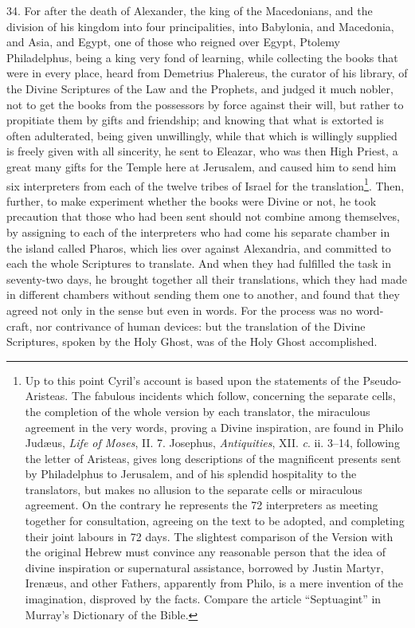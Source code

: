34. For after the death of Alexander, the king of the Macedonians, and the division of his kingdom into four principalities, into Babylonia, and Macedonia, and Asia, and Egypt, one of those who reigned over Egypt, Ptolemy Philadelphus, being a king very fond of learning, while collecting the books that were in every place, heard from Demetrius Phalereus, the curator of his library, of the Divine Scriptures of the Law and the Prophets, and judged it much nobler, not to get the books from the possessors by force against their will, but rather to propitiate them by gifts and friendship; and knowing that what is extorted is often adulterated, being given unwillingly, while that which is willingly supplied is freely given with all sincerity, he sent to Eleazar, who was then High Priest, a great many gifts for the Temple here at Jerusalem, and caused him to send him six interpreters from each of the twelve tribes of Israel for the translation\footnote{Up to this point Cyril’s account is based upon the statements of the Pseudo-Aristeas. The fabulous incidents which follow, concerning the separate cells, the completion of the whole version by each translator, the miraculous agreement in the very words, proving a Divine inspiration, are found in Philo Judæus, \emph{Life of Moses}, II. 7. Josephus, \emph{Antiquities}, XII. \emph{c}. ii. 3–14, following the letter of Aristeas, gives long descriptions of the magnificent presents sent by Philadelphus to Jerusalem, and of his splendid hospitality to the translators, but makes no allusion to the separate cells or miraculous agreement. On the contrary he represents the 72 interpreters as meeting together for consultation, agreeing on the text to be adopted, and completing their joint labours in 72 days. The slightest comparison of the Version with the original Hebrew must convince any reasonable person that the idea of divine inspiration or supernatural assistance, borrowed by Justin Martyr, Irenæus, and other Fathers, apparently from Philo, is a mere invention of the imagination, disproved by the facts. Compare the article “Septuagint” in Murray’s Dictionary of the Bible.}. Then, further, to make experiment whether the books were Divine or not, he took precaution that those who had been sent should not combine among themselves, by assigning to each of the interpreters who had come his separate chamber in the island called Pharos, which lies over against Alexandria, and committed to each the whole Scriptures to translate. And when they had fulfilled the task in seventy-two days, he brought together all their translations, which they had made in different chambers without sending them one to another, and found that they agreed not only in the sense but even in words. For the process was no word-craft, nor contrivance of human devices: but the translation of the Divine Scriptures, spoken by the Holy Ghost, was of the Holy Ghost accomplished.


